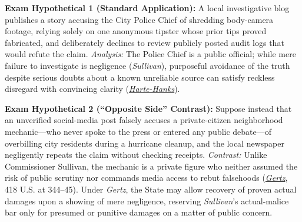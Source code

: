 \documentclass[12pt]{article}
\begin{document}
\textbf{Exam Hypothetical 1 (Standard Application):} A local investigative blog publishes a story accusing the City Police Chief of shredding body-camera footage, relying solely on one anonymous tipster whose prior tips proved fabricated, and deliberately declines to review publicly posted audit logs that would refute the claim. \textit{Analysis:} The Police Chief is a public official; while mere failure to investigate is negligence (\textit{Sullivan}), purposeful avoidance of the truth despite serious doubts about a known unreliable source can satisfy reckless disregard with convincing clarity (\textit{\href{https://supreme.justia.com/cases/federal/us/491/657/}{Harte-Hanks}}).

\textbf{Exam Hypothetical 2 (``Opposite Side'' Contrast):} Suppose instead that an unverified social-media post falsely accuses a private-citizen neighborhood mechanic---who never spoke to the press or entered any public debate---of overbilling city residents during a hurricane cleanup, and the local newspaper negligently repeats the claim without checking receipts. \textit{Contrast:} Unlike Commissioner Sullivan, the mechanic is a private figure who neither assumed the risk of public scrutiny nor commands media access to rebut falsehoods (\textit{\href{https://supreme.justia.com/cases/federal/us/418/323/}{Gertz}}, 418 U.S. at 344--45). Under \textit{Gertz}, the State may allow recovery of proven actual damages upon a showing of mere negligence, reserving \textit{Sullivan}'s actual-malice bar only for presumed or punitive damages on a matter of public concern.
\end{document}

